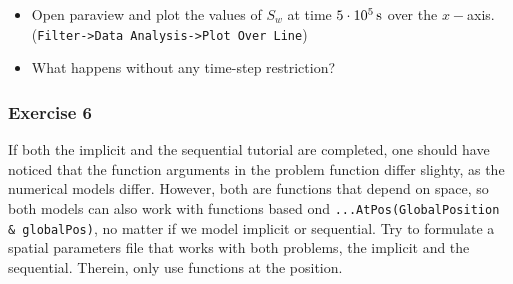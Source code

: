 \begin{itemize}
 \item Open paraview and plot the values of $S_w$ at time $\unit[5 \cdot 10^5]{s}$
 over the $x-$axis.\\ (\texttt{Filter->Data Analysis->Plot Over Line})
 \item What happens without any time-step restriction?
\end{itemize}

\subsubsection{Exercise 6}
If both the implicit and the sequential tutorial are completed, one should have
noticed that the function arguments in the problem function differ slighty, as
the numerical models differ. However, both are functions that depend on space,
so both models can also work with functions based ond \mbox{\texttt{...AtPos(GlobalPosition \& globalPos)}},
no matter if we model implicit or sequential. Try to formulate a spatial parameters
file that works with both problems, the implicit and the sequential. Therein, only
use functions at the position.
